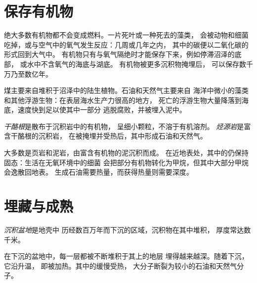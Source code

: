 \section{保存有机物}

绝大多数有机物都不会变成燃料。一片死叶或一种死去的藻类，
会被动物和细菌吃掉，或与空气中的氧气发生反应：几周或几年之内，
其中的碳便以二氧化碳的形式回到大气中。
有机物只有与氧气隔绝时才能保存下来，例如停滞沼泽的底部，
或水中不含氧气的海底与湖底。
有机物被更多沉积物掩埋后，
可以保存数千万乃至数亿年。

煤主要来自堆积于沼泽中的陆生植物。石油和天然气主要来自
海洋中微小的藻类和其他浮游生物：在表层海水生产力很高的地方，
死亡的浮游生物大量降落到海底，速度快到足以使其中一部分
逃脱腐败，并被埋入泥中。

\begin{definition}\label{def:g11:fossil-fuel-geology:source-rock}
\emph{干酪根}是散布于沉积岩中的有机物，
呈细小颗粒，不溶于有机溶剂。
\emph{烃源岩}是富含干酪根的沉积岩，
在被掩埋并受热后，其中形成石油和天然气。
\end{definition}

大多数是页岩和泥岩，由富含有机物的泥沉积而成。
在近地表处，其中的仍保持固态：生活在无氧环境中的细菌
会把部分有机物转化为甲烷，但其中大部分甲烷会逸散回地表。
生成石油需要热量，而获得热量则需要深度。

\section{埋藏与成熟}

\begin{definition}[沉积盆地]\label{def:g11:fossil-fuel-geology:basin}
\emph{沉积盆地}是地壳中
历经数百万年而下沉的区域，沉积物在其中堆积，
厚度常达数千米。
\end{definition}

在下沉的盆地中，每一层都被不断堆积于其上的地层
埋得越来越深。随着下沉，它沿升温，
即被加热。其中的缓慢受热，
大分子断裂为较小的石油和天然气分子。

